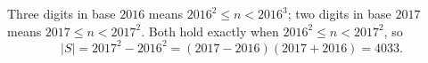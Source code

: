 Three digits in base $2016$ means $2016^2\le n<2016^3$; two digits in base $2017$ means $2017\le n<2017^2$. Both hold exactly when $2016^2\le n<2017^2$, so
\[|S|=2017^2-2016^2=(2017-2016)(2017+2016)=\boxed{4033}.\]
